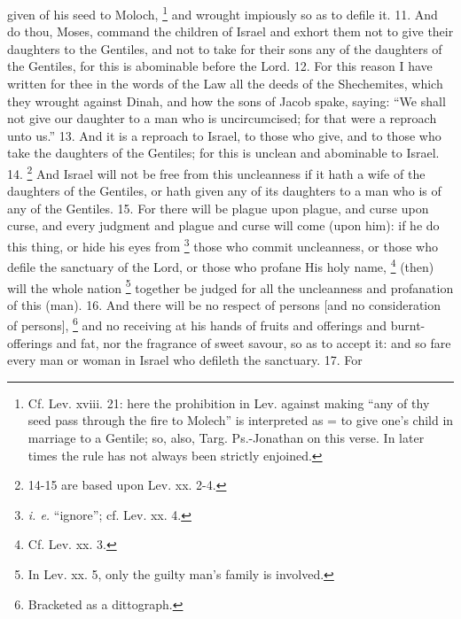 given of his seed to Moloch, \footnote{Cf. Lev. xviii. 21: here the prohibition in Lev. against making ``any of thy seed pass through the fire to Molech'' is interpreted as = to give one's child in marriage to a Gentile; so, also, Targ. Ps.-Jonathan on this verse. In later times the rule has not always been strictly enjoined.} and wrought impiously so as to defile it. 11. And do thou, Moses, command the children of Israel and exhort them not to give their daughters to the Gentiles, and not to take for their sons any of the daughters of the Gentiles, for this is abominable before the Lord. 12. For this reason I have written for thee in the words of the Law all the deeds of the Shechemites, which they wrought against Dinah, and how the sons of Jacob spake, saying: ``We shall not give our daughter to a man who is uncircumcised; for that were a reproach unto us.'' 13. And it is a reproach to Israel, to those who give, and to those who take the daughters of the Gentiles; for this is unclean and abominable to Israel. 14. \footnote{14-15 are based upon Lev. xx. 2-4.} And Israel will not be free from this uncleanness if it hath a wife of the daughters of the Gentiles, or hath given any of its daughters to a man who is of any of the Gentiles. 15. For there will be plague upon plague, and curse upon curse, and every judgment and plague and curse will come (upon him): if he do this thing, or hide his eyes from \footnote{\emph{i. e.} ``ignore''; cf. Lev. xx. 4.} those who commit uncleanness, or those who defile the sanctuary of the Lord, or those who profane His holy name, \footnote{Cf. Lev. xx. 3.} (then) will the whole nation \footnote{In Lev. xx. 5, only the guilty man's family is involved.} together be judged for all the uncleanness and profanation of this (man). 16. And there will be no respect of persons [and no consideration of persons], \footnote{Bracketed as a dittograph.} and no receiving at his hands of fruits and offerings and burnt-offerings and fat, nor the fragrance of sweet savour, so as to accept it: and so fare every man or woman in Israel who defileth the sanctuary. 17. For


